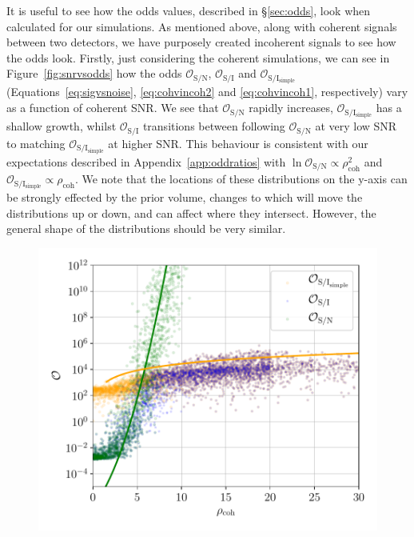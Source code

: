 It is useful to see how the odds values, described in \S\ref{sec:odds}, look when calculated for our simulations. As mentioned above, along with coherent
signals between two detectors, we have purposely created incoherent signals to see how the odds look. Firstly, just considering the coherent simulations,
we can see in Figure~\ref{fig:snrvsodds} how the odds $\mathcal{O}_{\text{S}/\text{N}}$, $\mathcal{O}_{\text{S}/\text{I}}$ and
$\mathcal{O}_{\text{S}/\text{I}_{\text{simple}}}$ (Equations~\ref{eq:sigvsnoise}, \ref{eq:cohvincoh2} and \ref{eq:cohvincoh1}, respectively) vary as a function
of coherent SNR. We see that $\mathcal{O}_{\text{S}/\text{N}}$ rapidly increases, $\mathcal{O}_{\text{S}/\text{I}_{\text{simple}}}$ has a shallow growth,
whilst $\mathcal{O}_{\text{S}/\text{I}}$ transitions between following $\mathcal{O}_{\text{S}/\text{N}}$ at very low SNR to matching 
$\mathcal{O}_{\text{S}/\text{I}_{\text{simple}}}$ at higher SNR. This behaviour is consistent with our expectations described in Appendix~\ref{app:oddratios} with
$\ln{\mathcal{O}_{\text{S}/\text{N}}} \propto \rho_{\text{coh}}^2$ and $\mathcal{O}_{\text{S}/\text{I}_{\text{simple}}} \propto \rho_{\text{coh}}$.
We note that the locations of these distributions on the y-axis can be strongly effected by the prior volume, changes to which will move the distributions
up or down, and can affect where they intersect. However, the general shape of the distributions should be very similar.

\begin{figure}[!phtb]
\begin{center}
\includegraphics[width=1\columnwidth]{./figures/codeeval/stats/snr_vs_odds/snr_v_odds_plot}
\caption{ \protect}
\end{center}
\end{figure}

